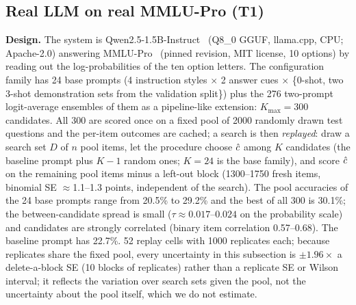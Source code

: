 \subsection{Real LLM on real MMLU-Pro (T1)}
\label{sec:t1}
\textbf{Design.} The system is Qwen2.5-1.5B-Instruct~\citep{qwen2024qwen25} (Q8\_0 GGUF, llama.cpp, CPU; Apache-2.0) answering MMLU-Pro~\citep{wang2024mmlupro} (pinned revision, MIT license, 10 options) by reading out the log-probabilities of the ten option letters. The configuration family has 24 base prompts (4 instruction styles $\times$ 2 answer cues $\times$ \{0-shot, two 3-shot demonstration sets from the validation split\}) plus the 276 two-prompt logit-average ensembles of them as a pipeline-like extension: $K_{\max}=300$ candidates. All 300 are scored once on a fixed pool of 2000 randomly drawn test questions and the per-item outcomes are cached; a search is then \emph{replayed}: draw a search set $D$ of $n$ pool items, let the procedure choose $\hat c$ among $K$ candidates (the baseline prompt plus $K-1$ random ones; $K=24$ is the base family), and score $\hat c$ on the remaining pool items minus a left-out block (1300--1750 fresh items, binomial SE $\approx$1.1--1.3 points, independent of the search). The pool accuracies of the 24 base prompts range from 20.5\% to 29.2\% and the best of all 300 is 30.1\%; the between-candidate spread is small ($\tau\approx0.017$--$0.024$ on the probability scale) and candidates are strongly correlated (binary item correlation 0.57--0.68). The baseline prompt has 22.7\%. 52 replay cells with 1000 replicates each; because replicates share the fixed pool, every uncertainty in this subsection is $\pm1.96\times$ a delete-a-block SE (10 blocks of replicates) rather than a replicate SE or Wilson interval; it reflects the variation over search sets given the pool, not the uncertainty about the pool itself, which we do not estimate.

